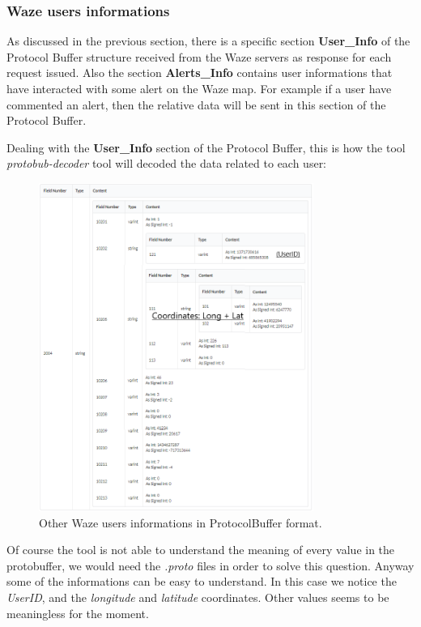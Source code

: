 		\subsubsection{Waze users informations}
			\par As discussed in the previous section, there is a specific section \textbf{User\_Info} of the Protocol Buffer structure received from the Waze servers as response for each request issued. Also the section \textbf{Alerts\_Info} contains user informations that have interacted with some alert on the Waze map. For example if a user have commented an alert, then the relative data will be sent in this section of the Protocol Buffer.\newline
			\par Dealing with the \textbf{User\_Info} section of the Protocol Buffer, this is how the tool \textit{protobub-decoder} tool will decoded the data related to each user:
			\begin{figure}[H]
				\centering
				\includegraphics[width=0.8\textwidth]{images/waze_userinfo.png}
				\caption{Other Waze users informations in ProtocolBuffer format.}
			\end{figure}
			Of course the tool is not able to understand the meaning of every value in the protobuffer, we would need the \textit{.proto} files in order to solve this question. Anyway some of the informations can be easy to understand. In this case we notice the \textit{UserID}, and the \textit{longitude} and \textit{latitude} coordinates. Other values seems to be meaningless for the moment.
			
